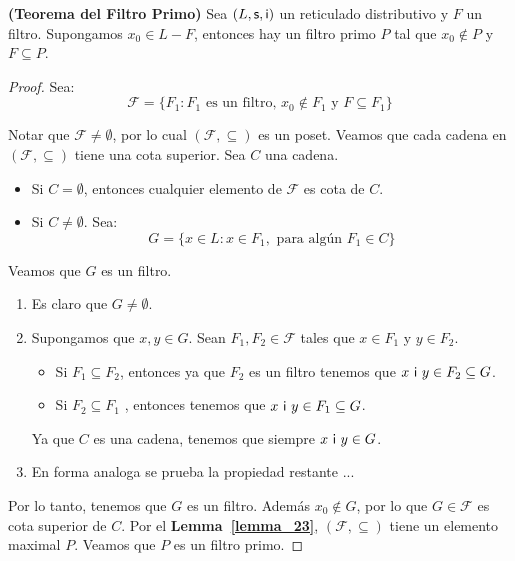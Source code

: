   \begin{theorem} \label{theorem_24}
    \PN \textbf{(Teorema del Filtro Primo)} Sea $(L, \mathsf{s}, \mathsf{i})$ un reticulado distributivo y $F$ un filtro. Supongamos $x_{0} \in
    L-F$, entonces hay un filtro primo $P$ tal que $x_{0} \notin P$ y $F \subseteq P$.
  \end{theorem}
  \begin{proof}
    \PN Sea:
    \[
      \mathcal{F} = \{F_{1}: F_{1} \text{ es un filtro, } x_{0} \notin F_{1} \text{ y } F \subseteq F_{1}\}
    \]

    \PN Notar que $\mathcal{F} \neq \emptyset$, por lo cual $(\mathcal{F}, \subseteq)$ es un poset.
    \PN Veamos que cada cadena en $(\mathcal{F}, \subseteq)$ tiene una cota superior. Sea $C$ una cadena.
    \begin{itemize}
      \item Si $C = \emptyset$, entonces cualquier elemento de $\mathcal{F}$ es cota de $C$.
      \item Si $C \neq \emptyset$. Sea:
        \[
          G = \{x \in L: x \in F_{1}, \text{ para algún } F_{1} \in C\}
        \]
    \end{itemize}

    \PN Veamos que $G$ es un filtro.
    \begin{enumerate}
      \item Es claro que $G \neq \emptyset$.
      \item Supongamos que $ x,y\in G$. Sean $F_{1},F_{2}\in \mathcal{F}$ tales que $x\in F_{1}$ y $y\in F_{2}$.
      \begin{itemize}
        \item Si $F_{1}\subseteq F_{2}$, entonces ya que $F_{2}$ es un filtro tenemos que $x \ \mathsf{i} \ y\in F_{2}\subseteq G$.
        \item Si $F_{2}\subseteq F_{1}$ , entonces tenemos que $x \ \mathsf{i} \ y \in F_{1} \subseteq G$.
      \end{itemize}
      \PN Ya que $C$ es una cadena, tenemos que siempre $x \ \IN \ y \in G$.

      \item En forma analoga se prueba la propiedad restante ... %
    \end{enumerate}

    \PN Por lo tanto, tenemos que $G$ es un filtro. Además $x_{0} \notin G$, por lo que $G \in \mathcal{F}$ es cota
    superior de $C$. Por el \textbf{Lemma~\ref{lemma_23}}, $(\mathcal{F}, \subseteq)$ tiene un elemento maximal $P$.
    Veamos que $P$ es un filtro primo.


\end{proof}
